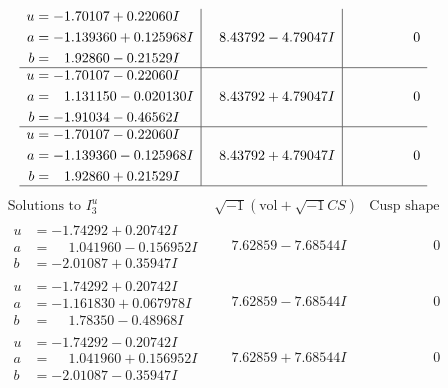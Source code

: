\documentclass[1p]{elsarticle_modified}
\theoremstyle{definition}
\newcommand{\I}{\sqrt{-1}}
\begin{document}
$$\begin{array}{c|c|c}
\begin{aligned}
u &= -1.70107 + 0.22060 I \\
a &= -1.139360 + 0.125968 I \\
b &= \phantom{-}1.92860 - 0.21529 I\end{aligned}
 & \phantom{-}8.43792 - 4.79047 I & \phantom{-0.000000 } 0 \\ \hline\begin{aligned}
u &= -1.70107 - 0.22060 I \\
a &= \phantom{-}1.131150 - 0.020130 I \\
b &= -1.91034 - 0.46562 I\end{aligned}
 & \phantom{-}8.43792 + 4.79047 I & \phantom{-0.000000 } 0 \\ \hline\begin{aligned}
u &= -1.70107 - 0.22060 I \\
a &= -1.139360 - 0.125968 I \\
b &= \phantom{-}1.92860 + 0.21529 I\end{aligned}
 & \phantom{-}8.43792 + 4.79047 I & \phantom{-0.000000 } 0\\
 \hline 
 \end{array}$$\newpage$$\begin{array}{c|c|c}  
\text{Solutions to }I^u_{3}& \I (\text{vol} + \sqrt{-1}CS) & \text{Cusp shape}\\
 \hline 
\begin{aligned}
u &= -1.74292 + 0.20742 I \\
a &= \phantom{-}1.041960 - 0.156952 I \\
b &= -2.01087 + 0.35947 I\end{aligned}
 & \phantom{-}7.62859 - 7.68544 I & \phantom{-0.000000 } 0 \\ \hline\begin{aligned}
u &= -1.74292 + 0.20742 I \\
a &= -1.161830 + 0.067978 I \\
b &= \phantom{-}1.78350 - 0.48968 I\end{aligned}
 & \phantom{-}7.62859 - 7.68544 I & \phantom{-0.000000 } 0 \\ \hline\begin{aligned}
u &= -1.74292 - 0.20742 I \\
a &= \phantom{-}1.041960 + 0.156952 I \\
b &= -2.01087 - 0.35947 I\end{aligned}
 & \phantom{-}7.62859 + 7.68544 I & \phantom{-0.000000 } 0 \\ \hline\begin{aligned}

\end{aligned}
\end{array}$$
\end{document}
